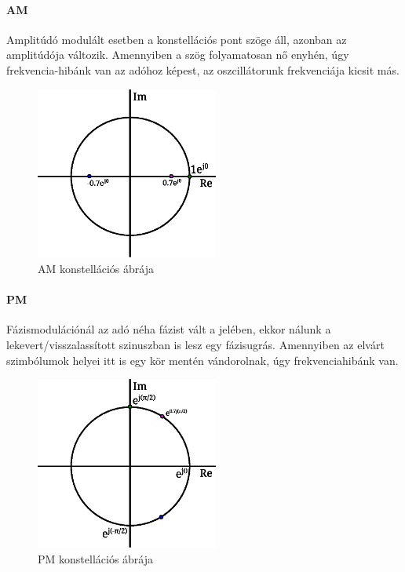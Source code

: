 \documentclass[12pt,a4paper]{article}
\begin{document}
\paragraph{AM}
Amplitúdó modulált esetben a konstellációs pont szöge áll, azonban az amplitúdója változik. Amennyiben a szög folyamatosan nő enyhén, úgy frekvencia-hibánk van az adóhoz képest, az oszcillátorunk frekvenciája kicsit más.
\begin{figure}[H]
\begin{center}
\includegraphics[width=6cm]{figures/modulaciok_workshop_konst_am_2.eps}
\caption{AM konstellációs ábrája}
\label{fig:konstam}
\end{center}
\end{figure}
\paragraph{PM}
Fázismodulációnál az adó néha fázist vált a jelében, ekkor nálunk a lekevert/visszalassított szinuszban is lesz egy fázisugrás. Amennyiben az elvárt szimbólumok helyei itt is egy kör mentén vándorolnak, úgy frekvenciahibánk van.
\begin{figure}[H]
\begin{center}
\includegraphics[width=6cm]{figures/modulaciok_workshop_konst_pm_2.eps}
\caption{PM konstellációs ábrája}
\label{fig:konstpm}
\end{center}
\end{figure}
\end{document}
